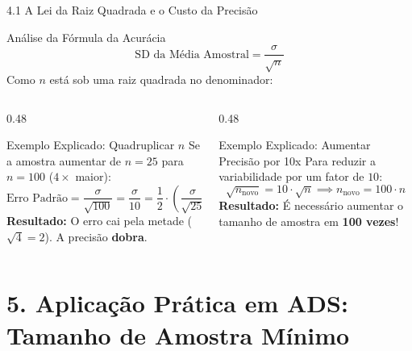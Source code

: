 \documentclass[10pt, aspectratio=169]{beamer}
\begin{document}
\begin{frame}{4.1 A Lei da Raiz Quadrada e o Custo da Precisão}
    \begin{block}{Análise da Fórmula da Acurácia}
        \[ \text{SD da Média Amostral} = \frac{\sigma}{\sqrt{n}} \]
        Como $n$ está sob uma raiz quadrada no denominador:
    \end{block}

    \vspace{0.2cm}

    \begin{columns}[T]
        \begin{column}{0.48\textwidth}
            \begin{alertblock}{Exemplo Explicado: Quadruplicar $n$}
                Se a amostra aumentar de $n=25$ para $n=100$ ($4\times$ maior):
                \[ \text{Erro Padrão} = \frac{\sigma}{\sqrt{100}} = \frac{\sigma}{10} = \frac{1}{2} \cdot \left(\frac{\sigma}{\sqrt{25}}\right) \]
                \textbf{Resultado:} O erro cai pela metade ($\sqrt{4} = 2$). A precisão \textbf{dobra}.
            \end{alertblock}
        \end{column}

        \begin{column}{0.48\textwidth}
            \begin{exampleblock}{Exemplo Explicado: Aumentar Precisão por 10x}
                Para reduzir a variabilidade por um fator de $10$:
                \[ \sqrt{n_{\text{novo}}} = 10 \cdot \sqrt{n} \implies n_{\text{novo}} = 100 \cdot n \]
                \textbf{Resultado:} É necessário aumentar o tamanho de amostra em \textbf{100 vezes}!
            \end{exampleblock}
        \end{column}
    \end{columns}
\end{frame}

\section{5. Aplicação Prática em ADS: Tamanho de Amostra Mínimo}
\end{document}
